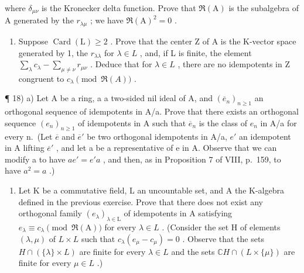 where \(\delta_{\mu\nu}\) is the Kronecker delta function. Prove that \(\Re(\mathrm{A})\) is the subalgebra of A generated by the \(r_{\lambda\mu}\) ; we have \(\Re(\mathrm{A})^{2}=0\) .

\begin{enumerate}
\def\labelenumi{\alph{enumi})}
\setcounter{enumi}{1}
\tightlist
\item
  Suppose \(\operatorname{Card}(\mathrm{L}) \geqslant 2\) . Prove that the center Z of A is the K-vector space generated by 1, the \(r_{\lambda\lambda}\) for \(\lambda \in L\) , and, if L is finite, the element \(\sum_{\lambda} c_{\lambda} - \sum_{\mu \neq \nu} r_{\mu\nu}\) . Deduce that for \(\lambda \in L\) , there are no idempotents in Z congruent to \(c_{\lambda} \pmod{\Re(A)}\) .
\end{enumerate}

¶ 18) a) Let A be a ring, a a two-sided nil ideal of A, and \((\overline{e}_{n})_{n\geqslant1}\) an orthogonal sequence of idempotents in A/a. Prove that there exists an orthogonal sequence \((e_{n})_{n\geqslant1}\) of idempotents in A such that \(\overline{e}_{n}\) is the class of \(e_{n}\) in A/a for every n.~(Let \(\overline{e}\) and \(\overline{e}'\) be two orthogonal idempotents in A/a, \(e'\) an idempotent in A lifting \(\overline{e}'\) , and let a be a representative of e in A. Observe that we can modify a to have \(ae' = e'a\) , and then, as in Proposition 7 of VIII, p.~159, to have \(a^{2} = a\) .)

\begin{enumerate}
\def\labelenumi{\alph{enumi})}
\setcounter{enumi}{1}
\tightlist
\item
  Let K be a commutative field, L an uncountable set, and A the K-algebra defined in the previous exercise. Prove that there does not exist any orthogonal family \((e_{\lambda})_{\lambda\in\mathrm{L}}\) of idempotents in A satisfying \(e_{\lambda}\equiv c_{\lambda} \pmod{\Re(\mathrm{A})}\) for every \(\lambda\in L\) . (Consider the set H of elements \((\lambda,\mu)\) of \(L\times L\) such that \(c_{\lambda}(e_{\mu}-c_{\mu})=0\) . Observe that the sets \(H\cap(\{\lambda\}\times L)\) are finite for every \(\lambda\in L\) and the sets \(\mathbb{C}H\cap(L\times\{\mu\})\) are finite for every \(\mu\in L\) .)
\end{enumerate}


